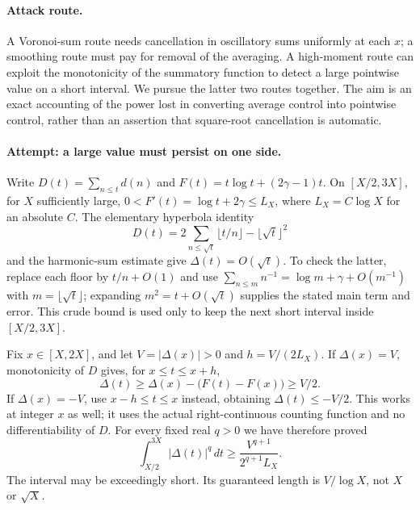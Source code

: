 \documentclass[11pt,a4paper]{article}
\numberwithin{equation}{section}
\begin{document}
\paragraph{Attack route.}
A Voronoi-sum route needs cancellation in oscillatory sums uniformly at each
$x$; a smoothing route must pay for removal of the averaging. A high-moment
route can exploit the monotonicity of the summatory function to detect a
large pointwise value on a short interval. We pursue the latter two routes
together. The aim is an exact accounting of the power lost in converting
average control into pointwise control, rather than an assertion that
square-root cancellation is automatic.

\paragraph{Attempt: a large value must persist on one side.}
Write $D(t)=\sum_{n\le t}d(n)$ and
$F(t)=t\log t+(2\gamma-1)t$. On $[X/2,3X]$, for $X$ sufficiently large,
$0<F'(t)=\log t+2\gamma\le L_X$, where $L_X=C\log X$ for an absolute
$C$. The elementary hyperbola identity
\[
 D(t)=2\sum_{n\le\sqrt t}\lfloor t/n\rfloor-\lfloor\sqrt t\rfloor^2
\]
and the harmonic-sum estimate give $\Delta(t)=O(\sqrt t)$.
To check the latter, replace each floor by $t/n+O(1)$ and use
$\sum_{n\le m}n^{-1}=\log m+\gamma+O(m^{-1})$ with
$m=\lfloor\sqrt t\rfloor$; expanding $m^2=t+O(\sqrt t)$ supplies the
stated main term and error. This crude bound is used only to keep the next
short interval inside $[X/2,3X]$.

Fix $x\in[X,2X]$, and let $V=|\Delta(x)|>0$ and $h=V/(2L_X)$.
If $\Delta(x)=V$, monotonicity of $D$ gives, for $x\le t\le x+h$,
\[
 \Delta(t)\ge\Delta(x)-\bigl(F(t)-F(x)\bigr)\ge V/2.
\]
If $\Delta(x)=-V$, use $x-h\le t\le x$ instead, obtaining
$\Delta(t)\le-V/2$. This works at integer $x$ as well; it uses the actual
right-continuous counting function and no differentiability of $D$.
For every fixed real $q>0$ we have therefore proved
\begin{equation}\label{eq170-persistence}
 \int_{X/2}^{3X}|\Delta(t)|^q\,dt
       \ge \frac{V^{q+1}}{2^{q+1}L_X}.
\end{equation}
The interval may be exceedingly short. Its guaranteed length is $V/\log X$,
not $X$ or $\sqrt X$.
\end{document}
